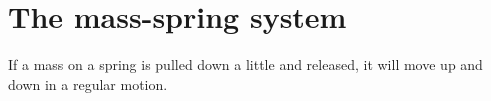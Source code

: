 \section{The mass-spring system}

If a mass on a spring is pulled down a little and released, it will move up and down in a regular motion.
